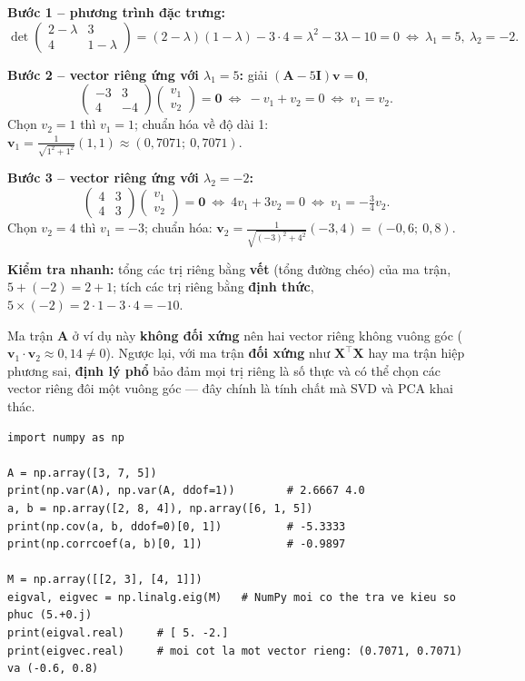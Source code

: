 \noindent\textbf{Bước 1 -- phương trình đặc trưng:}
\[
    \det\begin{pmatrix} 2 - \lambda & 3 \\ 4 & 1 - \lambda \end{pmatrix} = (2 - \lambda)(1 - \lambda) - 3 \cdot 4 = \lambda^2 - 3\lambda - 10 = 0
    \ \Leftrightarrow\ \lambda_1 = 5,\ \lambda_2 = -2.
\]

\noindent\textbf{Bước 2 -- vector riêng ứng với $\lambda_1 = 5$:} giải $(\mathbf{A} - 5\mathbf{I})\mathbf{v} = \mathbf{0}$,
\[
    \begin{pmatrix} -3 & 3 \\ 4 & -4 \end{pmatrix}\begin{pmatrix} v_1 \\ v_2 \end{pmatrix} = \mathbf{0}
    \ \Leftrightarrow\ -v_1 + v_2 = 0 \ \Leftrightarrow\ v_1 = v_2 .
\]
Chọn $v_2 = 1$ thì $v_1 = 1$; chuẩn hóa về độ dài 1: $\mathbf{v}_1 = \frac{1}{\sqrt{1^2 + 1^2}}(1, 1) \approx (0{,}7071;\ 0{,}7071)$.

\noindent\textbf{Bước 3 -- vector riêng ứng với $\lambda_2 = -2$:}
\[
    \begin{pmatrix} 4 & 3 \\ 4 & 3 \end{pmatrix}\begin{pmatrix} v_1 \\ v_2 \end{pmatrix} = \mathbf{0}
    \ \Leftrightarrow\ 4v_1 + 3v_2 = 0 \ \Leftrightarrow\ v_1 = -\tfrac{3}{4}v_2 .
\]
Chọn $v_2 = 4$ thì $v_1 = -3$; chuẩn hóa: $\mathbf{v}_2 = \frac{1}{\sqrt{(-3)^2 + 4^2}}(-3, 4) = (-0{,}6;\ 0{,}8)$.

\noindent\textbf{Kiểm tra nhanh:} tổng các trị riêng bằng \textbf{vết} (tổng đường chéo) của ma trận, $5 + (-2) = 2 + 1$; tích các trị riêng bằng \textbf{định thức}, $5 \times (-2) = 2 \cdot 1 - 3 \cdot 4 = -10$.

Ma trận $\mathbf{A}$ ở ví dụ này \textbf{không đối xứng} nên hai vector riêng không vuông góc ($\mathbf{v}_1 \cdot \mathbf{v}_2 \approx 0{,}14 \neq 0$). Ngược lại, với ma trận \textbf{đối xứng} như $\mathbf{X}^\top\mathbf{X}$ hay ma trận hiệp phương sai, \textbf{định lý phổ} bảo đảm mọi trị riêng là số thực và có thể chọn các vector riêng đôi một vuông góc --- đây chính là tính chất mà SVD và PCA khai thác.

\begin{lstlisting}[caption={Phương sai, hiệp phương sai và trị riêng với NumPy}]
import numpy as np

A = np.array([3, 7, 5])
print(np.var(A), np.var(A, ddof=1))        # 2.6667 4.0
a, b = np.array([2, 8, 4]), np.array([6, 1, 5])
print(np.cov(a, b, ddof=0)[0, 1])          # -5.3333
print(np.corrcoef(a, b)[0, 1])             # -0.9897

M = np.array([[2, 3], [4, 1]])
eigval, eigvec = np.linalg.eig(M)   # NumPy moi co the tra ve kieu so phuc (5.+0.j)
print(eigval.real)     # [ 5. -2.]
print(eigvec.real)     # moi cot la mot vector rieng: (0.7071, 0.7071) va (-0.6, 0.8)
\end{lstlisting}

